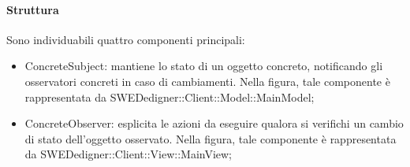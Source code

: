 \documentclass[../PianoDiQualifica.tex]{subfiles}
\begin{document}
				\paragraph{Struttura\\}
					Sono individuabili quattro componenti principali:
					\begin{itemize}
						\item ConcreteSubject: mantiene lo stato di un oggetto concreto, notificando
						gli osservatori concreti in caso di cambiamenti. Nella figura, tale componente è rappresentata da SWEDedigner::Client::Model::MainModel;
						\item ConcreteObserver: esplicita le azioni da eseguire qualora si verifichi un cambio di stato
						dell'oggetto osservato. Nella figura, tale componente è rappresentata da SWEDedigner::Client::View::MainView;
					\end{itemize}
\end{document}
